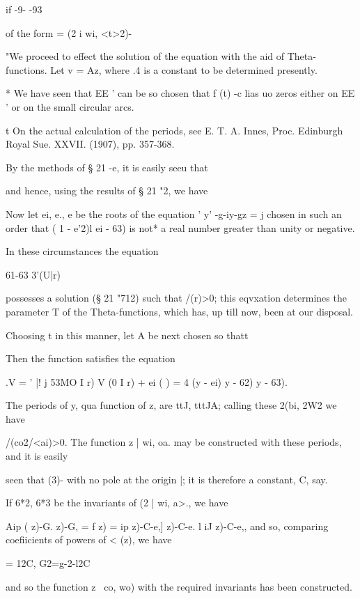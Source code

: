    if -9- -93

of the form = (2 i wi, <t>2)-

"We proceed to effect the solution of the equation with the aid of
Theta-functions. Let v = Az, where .4 is a constant to be determined
presently.

* We have seen that EE ' can be so chosen that f (t) -c lias uo zeros
either on EE ' or on the small circular arcs.

t On the actual calculation of the periods, see E. T. A. Innes, Proc.
Edinburgh Royal Sue. XXVII. (1907), pp. 357-368.

%
%

By the methods of § 21 -e, it is easily seeu that

and hence, using the results of § 21 "2, we have

Now let ei, e., e be the roots of the equation ' y' -g-iy-gz = j
chosen in such an order that ( 1 - e'2)l ei - 63) is not* a real
number greater than unity or negative.

In these circumstances the equation

61-63 3'(U|r)

possesses a solution (§ 21 "712) such that /(r)>0; this eqvxation
determines the parameter T of the Theta-functions, which has, up till
now, been at our disposal.

Choosing t in this manner, let A be next chosen so thatt

Then the function satisfies the equation

.V = ' |! j 53MO I r) V (0 I r) + ei ( ) = 4 (y - ei) y - 62) y - 63).

The periods of y, qua function of z, are ttJ, tttJA; calling these
2(bi, 2W2 we have

/(co2/<ai)>0. The function z | wi, oa. may be constructed with these
periods, and it is easily

seen that (3)- %
with no pole at the origin |; it is therefore a constant, C, say.

If 6*2, 6*3 be the invariants of (2 | wi, a>., we have

Aip ( z)-G. z)-G, = f z) = ip z)-C-e,] z)-C-e. l iJ z)-C-e,, and so,
comparing coefiicients of powers of < (z), we have

= 12C, G2=g-2-l2C%

and so the function z \ co, wo) with the required invariants has been
constructed.

